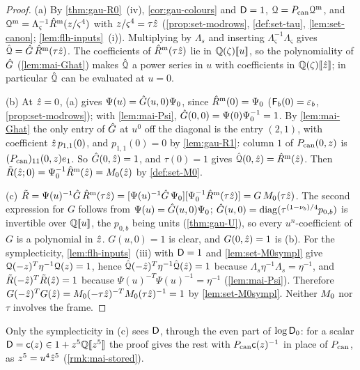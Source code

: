 \begin{proof}
(a) By \cref{thm:gau-R0}~(iv), \cref{cor:gau-colours} and $\mathsf{D}=1$, $\mathcal{Q}=P_{\mathrm{can}}\mathcal{Q}^{\mathrm m}$, and $\mathcal{Q}^{\mathrm m}=\Lambda_\varsigma^{-1}\hat{R}^{\mathrm m}(z/\varsigma^4)$ with $z/\varsigma^4=\tau\hat{z}$ (\cref{prop:set-modrows}, \cref{def:set-tau}, \cref{lem:set-canon}; \cref{lem:flh-inputs}~(i)). Multiplying by $\Lambda_s$ and inserting $\Lambda_\varsigma^{-1}\Lambda_\varsigma$ gives $\hat{\mathcal{Q}}=\hat{G}\,\hat{R}^{\mathrm m}(\tau\hat{z})$. The coefficients of $\hat{R}^{\mathrm m}(\tau\hat{z})$ lie in $\mathbb{Q}(\zeta)[\![ u ]\!]$, so the polynomiality of $\hat{G}$ (\cref{lem:mai-Ghat}) makes $\hat{\mathcal{Q}}$ a power series in $u$ with coefficients in $\mathbb{Q}(\zeta)[\![ \hat{z} ]\!]$; in particular $\hat{\mathcal{Q}}$ can be evaluated at $u=0$.

(b) At $\hat{z}=0$, (a) gives $\Psi(u)=\hat{G}(u,0)\Psi_0$, since $\hat{R}^{\mathrm m}(0)=\Psi_0$ ($\mathsf{F}_b(0)=\varepsilon_b$, \cref{prop:set-modrows}); with \cref{lem:mai-Psi}, $\hat{G}(0,0)=\Psi(0)\Psi_0^{-1}=1$. By \cref{lem:mai-Ghat} the only entry of $\hat{G}$ at $u^0$ off the diagonal is the entry $(2,1)$, with coefficient $\hat{z}\,p_{1,1}(0)$, and $p_{1,1}(0)=0$ by \cref{lem:gau-R1}: column $1$ of $P_{\mathrm{can}}(0,z)$ is $(P_{\mathrm{can}})_{11}(0,z)e_1$. So $\hat{G}(0,\hat{z})=1$, and $\tau(0)=1$ gives $\hat{\mathcal{Q}}(0,\hat{z})=\hat{R}^{\mathrm m}(\hat{z})$. Then $\tilde R(\hat{z};0)=\Psi_0^{-1}\hat{R}^{\mathrm m}(\hat{z})=M_{0}(\hat{z})$ by \cref{def:set-M0}.

(c) $\tilde R=\Psi(u)^{-1}\hat{G}\,\hat{R}^{\mathrm m}(\tau\hat{z})=[\Psi(u)^{-1}\hat{G}\,\Psi_0][\Psi_0^{-1}\hat{R}^{\mathrm m}(\tau\hat{z})]=G\,M_{0}(\tau\hat{z})$. The second expression for $G$ follows from $\Psi(u)=\hat{G}(u,0)\Psi_0$; $\hat{G}(u,0)=\operatorname{diag}(\tau^{(1-\nu_b)/4}p_{0,b})$ is invertible over $\mathbb{Q}[\![ u ]\!]$, the $p_{0,b}$ being units (\cref{thm:gau-U}), so every $u^n$-coefficient of $G$ is a polynomial in $\hat{z}$. $G(u,0)=1$ is clear, and $G(0,\hat{z})=1$ is (b). For the symplecticity, \cref{lem:flh-inputs}~(iii) with $\mathsf{D}=1$ and \cref{lem:set-M0sympl} give $\mathcal{Q}(-z)^T\eta^{-1}\mathcal{Q}(z)=1$, hence $\hat{\mathcal{Q}}(-\hat{z})^T\eta^{-1}\hat{\mathcal{Q}}(\hat{z})=1$ because $\Lambda_s\eta^{-1}\Lambda_s=\eta^{-1}$, and $\tilde R(-\hat{z})^T\tilde R(\hat{z})=1$ because $\Psi(u)^{-T}\Psi(u)^{-1}=\eta^{-1}$ (\cref{lem:mai-Psi}). Therefore $G(-\hat{z})^TG(\hat{z})=M_{0}(-\tau\hat{z})^{-T}M_{0}(\tau\hat{z})^{-1}=1$ by \cref{lem:set-M0sympl}. Neither $M_{0}$ nor $\tau$ involves the frame.
\end{proof}

Only the symplecticity in (c) sees $\mathsf{D}$, through the even part of $\log\mathsf{D}_0$: for a scalar $\mathsf{D}=\mathsf{c}(z)\in1+z^5\mathbb{Q}[\![ z^5 ]\!]$ the proof gives the rest with $P_{\mathrm{can}}\mathsf{c}(z)^{-1}$ in place of $P_{\mathrm{can}}$, as $z^5=u^4\hat{z}^5$ (\cref{rmk:mai-stored}).

